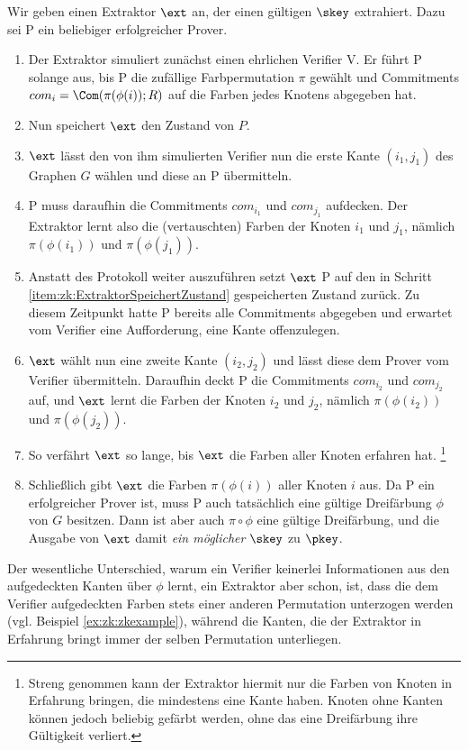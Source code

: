 \begin{beweis}
	Wir geben einen Extraktor $\ext$ an, der einen gültigen $\skey$ extrahiert. Dazu sei P ein beliebiger erfolgreicher Prover.
	
	\begin{enumerate}
		\item Der Extraktor simuliert zunächst einen ehrlichen Verifier V. Er führt P solange aus, bis P die zufällige Farbpermutation $\pi$ gewählt und Commitments $com_i = \Com(\pi(\phi(i));R)$ auf die Farben jedes Knotens abgegeben hat.	
		\item \label{item:zk:ExtraktorSpeichertZustand}
		Nun speichert $\ext$ den Zustand von $P$.
		\item $\ext$ lässt den von ihm simulierten Verifier nun die erste Kante $(i_1, j_1)$ des Graphen $G$ wählen und diese an P übermitteln.
		\item P muss daraufhin die Commitments $com_{i_1}$ und $com_{j_1}$ aufdecken. Der Extraktor lernt also die (vertauschten) Farben der Knoten $i_1$ und $j_1$, nämlich $\pi(\phi(i_1))$ und $\pi(\phi(j_1))$.
		\item Anstatt des Protokoll weiter auszuführen setzt $\ext$ P auf den in Schritt \ref{item:zk:ExtraktorSpeichertZustand} gespeicherten Zustand zurück. Zu diesem Zeitpunkt hatte P bereits alle Commitments abgegeben und erwartet vom Verifier eine Aufforderung, eine Kante offenzulegen.
		\item $\ext$ wählt nun eine zweite Kante $(i_2, j_2)$ und lässt diese dem Prover vom Verifier übermitteln. Daraufhin deckt P die Commitments $com_{i_2}$ und $com_{j_2}$ auf, und $\ext$ lernt die Farben der Knoten $i_2$ und $j_2$, nämlich $\pi(\phi(i_2))$ und $\pi(\phi(j_2))$.
		\item So verfährt $\ext$ so lange, bis $\ext$ die Farben aller Knoten erfahren hat.
		\footnote{Streng genommen kann der Extraktor hiermit nur die Farben von Knoten in Erfahrung bringen, die mindestens eine Kante haben. Knoten ohne Kanten können jedoch beliebig gefärbt werden, ohne das eine Dreifärbung ihre Gültigkeit verliert.}
		\item Schließlich gibt $\ext$ die Farben $\pi(\phi(i))$ aller Knoten $i$ aus. Da P ein erfolgreicher Prover ist, muss P auch tatsächlich eine gültige Dreifärbung $\phi$ von $G$ besitzen. Dann ist aber auch $\pi \circ \phi$ eine gültige Dreifärbung, und die Ausgabe von $\ext$ damit \emph{ein möglicher} $\skey$ zu $\pkey$.
	\end{enumerate}
\end{beweis}

Der wesentliche Unterschied, warum ein Verifier keinerlei Informationen aus den aufgedeckten Kanten über $\phi$ lernt, ein Extraktor aber schon, ist, dass die dem Verifier aufgedeckten Farben stets einer anderen Permutation unterzogen werden (vgl. Beispiel \ref{ex:zk:zkexample}), während die Kanten, die der Extraktor in Erfahrung bringt immer der selben Permutation unterliegen.
